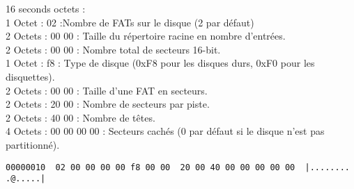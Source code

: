 \documentclass[11pt]{report}
\begin{document}
16 seconds octets :\\
1 Octet : 02 :Nombre de FATs sur le disque (2 par défaut)\\
2 Octets : 00 00 : Taille du répertoire racine en nombre d'entrées.\\
2 Octets : 00 00 : Nombre total de secteurs 16-bit.\\
1 Octet : f8 : Type de disque (0xF8 pour les disques durs, 0xF0 pour les disquettes).\\
2 Octets : 00 00 : Taille d'une FAT en secteurs.\\
2 Octets : 20 00 : Nombre de secteurs par piste.\\
2 Octets : 40 00 : Nombre de têtes.\\
4 Octets : 00 00 00 00 : Secteurs cachés (0 par défaut si le disque n'est pas partitionné).
\begin{verbatim}
00000010  02 00 00 00 00 f8 00 00  20 00 40 00 00 00 00 00  |........ .@.....|
\end{verbatim}
\newpage
\end{document}
